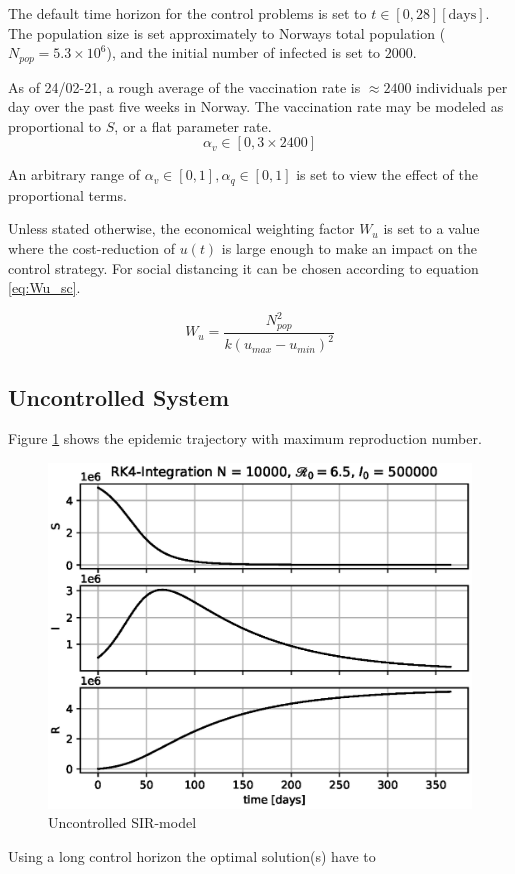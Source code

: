 The default time horizon for the control problems is set to $t \in [0, 28] [\text{days}]$. The population size is set approximately to Norways total population ($N_{pop} = 5.3\times 10^6$), and the initial number of infected is set to $2000$. 

As of 24/02-21, a rough average of the vaccination rate is $\approx 2400$ individuals per day over the past five weeks in Norway. The vaccination rate may be modeled as proportional to $S$, or a flat parameter rate. 
\begin{equation}
    \alpha_v \in [0, 3\times2400]
\end{equation}

An arbitrary range of $\alpha_v \in [0, 1], \alpha_q \in [0, 1]$ is set to view the effect of the proportional terms.

Unless stated otherwise, the economical weighting factor $W_u$ is set to a value where the cost-reduction of $u(t)$ is large enough to make an impact on the control strategy. For social distancing it can be chosen according to equation \ref{eq:Wu_sc}.

\begin{equation}
    W_u = \frac{N_{pop}^2}{k(u_{max}-u_{min})^2}
    \label{eq:Wu_sc}
\end{equation}

\subsection{Uncontrolled System}
Figure \ref{fig:SIR_Uncontrolled} shows the epidemic trajectory with maximum reproduction number.

\begin{figure}[H]
    \centering
    \includegraphics[width=.8\textwidth]{pythonProject/Figures/Uncontrolled_SIR.eps}
    \caption{Uncontrolled SIR-model}
    \label{fig:SIR_Uncontrolled}
\end{figure}

Using a long control horizon the optimal solution(s) have to 



